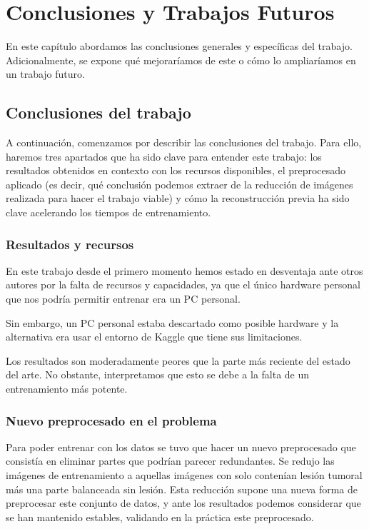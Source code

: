 \chapter{Conclusiones y Trabajos Futuros}

En este capítulo abordamos las conclusiones generales y específicas del trabajo. Adicionalmente, se expone qué mejoraríamos de este o cómo lo ampliaríamos en un trabajo futuro.

\section{Conclusiones del trabajo}

A continuación, comenzamos por describir las conclusiones del trabajo. Para ello, haremos tres apartados que ha sido clave para entender este trabajo: los resultados obtenidos en contexto con los recursos disponibles, el preprocesado aplicado (es decir, qué conclusión podemos extraer de la reducción de imágenes realizada para hacer el trabajo viable) y cómo la reconstrucción previa ha sido clave acelerando los tiempos de entrenamiento. 

\subsection{Resultados y recursos}

En este trabajo desde el primero momento hemos estado en desventaja ante otros autores por la falta de recursos y capacidades, ya que el único hardware personal que nos podría permitir entrenar era un PC personal. 

Sin embargo, un PC personal estaba descartado como posible hardware y la alternativa era usar el entorno de Kaggle que tiene sus limitaciones. 

Los resultados son moderadamente peores que la parte más reciente del estado del arte. No obstante, interpretamos que esto se debe a la falta de un entrenamiento más potente.  

\subsection{Nuevo preprocesado en el problema}

Para poder entrenar con los datos se tuvo que hacer un nuevo preprocesado que consistía en eliminar partes que podrían parecer redundantes. Se redujo las imágenes de entrenamiento a aquellas imágenes con solo contenían lesión tumoral más una parte balanceada sin lesión. Esta reducción supone una nueva forma de preprocesar este conjunto de datos, y ante los resultados podemos considerar que se han mantenido estables, validando en la práctica este preprocesado.

